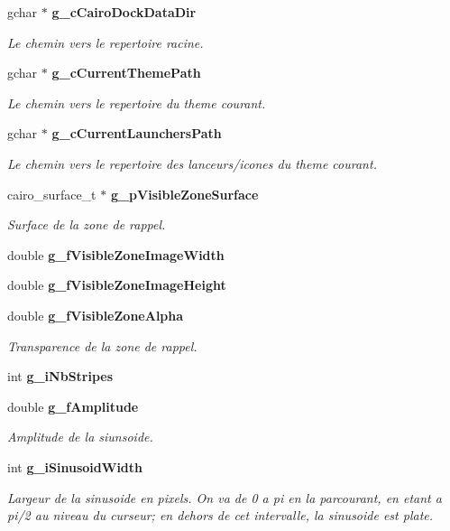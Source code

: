 \begin{CompactItemize}
gchar $\ast$ {\bf g\_\-cCairoDockDataDir}
\begin{CompactList}\small\item\em Le chemin vers le repertoire racine. \item\end{CompactList}\item 
gchar $\ast$ {\bf g\_\-cCurrentThemePath}
\begin{CompactList}\small\item\em Le chemin vers le repertoire du theme courant. \item\end{CompactList}\item 
gchar $\ast$ {\bf g\_\-cCurrentLaunchersPath}
\begin{CompactList}\small\item\em Le chemin vers le repertoire des lanceurs/icones du theme courant. \item\end{CompactList}\item 
cairo\_\-surface\_\-t $\ast$ {\bf g\_\-pVisibleZoneSurface}
\begin{CompactList}\small\item\em Surface de la zone de rappel. \item\end{CompactList}\item 
double {\bf g\_\-fVisibleZoneImageWidth}
\item 
double {\bf g\_\-fVisibleZoneImageHeight}
\item 
double {\bf g\_\-fVisibleZoneAlpha}
\begin{CompactList}\small\item\em Transparence de la zone de rappel. \item\end{CompactList}\item 
int {\bf g\_\-iNbStripes}
\item 
double {\bf g\_\-fAmplitude}
\begin{CompactList}\small\item\em Amplitude de la siunsoide. \item\end{CompactList}\item 
int {\bf g\_\-iSinusoidWidth}
\begin{CompactList}\small\item\em Largeur de la sinusoide en pixels. On va de 0 a pi en la parcourant, en etant a pi/2 au niveau du curseur; en dehors de cet intervalle, la sinusoide est plate. \item\end{CompactList}\item 

\end{CompactItemize}
